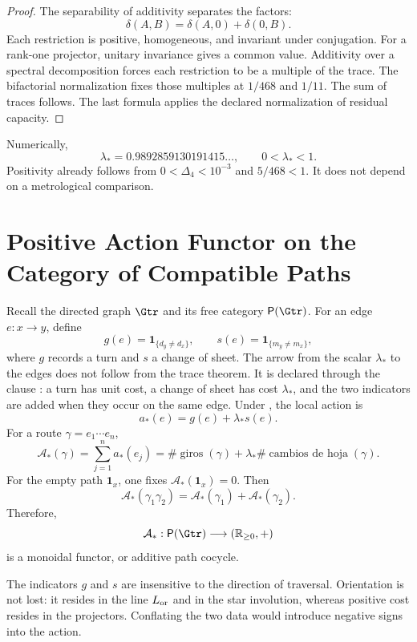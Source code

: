 \begin{proof}
The separability of additivity separates the factors:
\[
 \delta(A,B)=\delta(A,0)+\delta(0,B).
\]
Each restriction is positive, homogeneous, and invariant under conjugation. For
a rank-one projector, unitary invariance gives a common value.
Additivity over a spectral decomposition forces each restriction
to be a multiple of the trace. The bifactorial normalization fixes those multiples at
\(1/468\) and \(1/11\). The sum of traces follows. The last formula
applies the declared normalization of residual capacity.
\end{proof}

Numerically,
\[
 \boxed{\lambda_*=0.9892859130191415\ldots},
 \qquad
 0<\lambda_*<1.
\]
Positivity already follows from
\(0<\Delta_4<10^{-3}\) and \(5/468<1\). It does not depend on a
metrological comparison.

\section{Positive Action Functor on the Category of Compatible Paths}

Recall the directed graph \(\Gtr\) and its free category
\(\mathsf P(\Gtr)\). For an edge
\(e:x\to y\), define
\[
 g(e)=\mathbf1_{\{d_y\ne d_x\}},
 \qquad
 s(e)=\mathbf1_{\{m_y\ne m_x\}},
\]
where \(g\) records a turn and \(s\) a change of sheet. The arrow from the scalar \(\lambda_*\) to the edges does not follow from the trace theorem. It is declared through the clause \HLoc: a turn has unit cost, a change of sheet has cost \(\lambda_*\), and the two indicators are added when they occur on the same edge. Under \HLoc, the local action is
\[
 \boxed{a_*(e)=g(e)+\lambda_*s(e).}
\]
For a route \(\gamma=e_1\cdots e_n\),
\[
 \mathcal A_*(\gamma)
 =\sum_{j=1}^na_*(e_j)
 =\#\operatorname{giros}(\gamma)
 +\lambda_*\#\operatorname{cambios\ de\ hoja}(\gamma).
\]
For the empty path \(\mathbf1_x\), one fixes
\(\mathcal A_*(\mathbf1_x)=0\). Then
\[
 \boxed{
 \mathcal A_*(\gamma_1\gamma_2)
 =\mathcal A_*(\gamma_1)+\mathcal A_*(\gamma_2).
 }
\]
Therefore,
\[
 \mathcal A_*:\mathsf P(\Gtr)\longrightarrow(\mathbb R_{\ge0},+)
\]
is a monoidal functor, or additive path cocycle.

The indicators \(g\) and \(s\) are insensitive to the direction
of traversal. Orientation is not lost: it resides in the line
\(L_{\rm or}\) and in the star involution, whereas positive cost resides in
the projectors. Conflating the two data would introduce negative signs into
the action.

